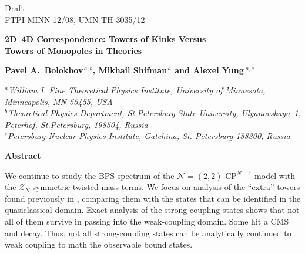 \documentclass[epsfig,12pt]{article}
\newcommand{\mc}[1]{\mathcal{#1}}
\begin{document}



\begin{titlepage}

\begin{flushright}
Draft\\
%
FTPI-MINN-12/08, UMN-TH-3035/12\\
\end{flushright}


\begin{center}
{  \Large \bf  
			2D--4D Correspondence: Towers of Kinks Versus\\[1mm]  
			Towers of Monopoles
			in  Theories
			
}
\end{center}

\begin{center}

 {\large
 \bf   Pavel A.~Bolokhov$^{\,a,b}$,  Mikhail Shifman$^{\,a}$ and Alexei Yung$^{\,\,a,c}$}
\end {center}

\begin{center}

$^a${\it  William I. Fine Theoretical Physics Institute, University of Minnesota,
Minneapolis, MN 55455, USA}\\
$^b${\it Theoretical Physics Department, St.Petersburg State University, Ulyanovskaya~1, 
	 Peterhof, St.Petersburg, 198504, Russia}\\
$^{c}${\it Petersburg Nuclear Physics Institute, Gatchina, St. Petersburg
188300, Russia
}

{\large\bf Abstract}
\end{center}

	We continue to study the BPS spectrum of the ${\mathcal N}=(2,2)$ CP$^{N-1}$ model  with 
	the $ \mc{Z}_N $-symmetric twisted mass terms.
	We focus on analysis of the ``extra'' towers found previously in \cite{Bolokhov:2011mp},
	 comparing them with  the   states that can be identified in the quasiclassical domain.
	Exact analysis of the strong-coupling states shows that not all of them survive in passing into the
	weak-coupling domain. Some hit a CMS and decay.
	Thus, not all strong-coupling states can be analytically continued to weak coupling 
	to math the observable bound states.
	

\end{titlepage}
\end{document}
